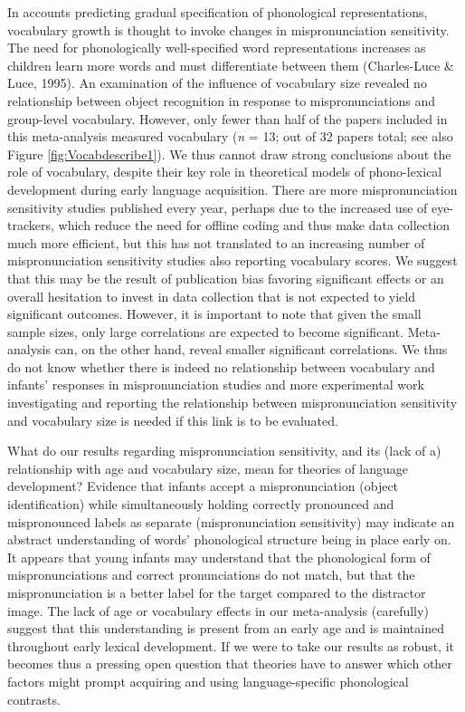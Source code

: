 \documentclass[man]{apa6}
\begin{document}
In accounts predicting gradual specification of phonological representations, vocabulary growth is thought to invoke changes in mispronunciation sensitivity. The need for phonologically well-specified word representations increases as children learn more words and must differentiate between them (Charles-Luce \& Luce, 1995). An examination of the influence of vocabulary size revealed no relationship between object recognition in response to mispronunciations and group-level vocabulary. However, only fewer than half of the papers included in this meta-analysis measured vocabulary (\emph{n} = 13; out of 32 papers total; see also Figure \ref{fig:Vocabdescribe1}). We thus cannot draw strong conclusions about the role of vocabulary, despite their key role in theoretical models of phono-lexical development during early language acquisition. There are more mispronunciation sensitivity studies published every year, perhaps due to the increased use of eye-trackers, which reduce the need for offline coding and thus make data collection much more efficient, but this has not translated to an increasing number of mispronunciation sensitivity studies also reporting vocabulary scores. We suggest that this may be the result of publication bias favoring significant effects or an overall hesitation to invest in data collection that is not expected to yield significant outcomes. However, it is important to note that given the small sample sizes, only large correlations are expected to become significant. Meta-analysis can, on the other hand, reveal smaller significant correlations. We thus do not know whether there is indeed no relationship between vocabulary and infants' responses in mispronunciation studies and more experimental work investigating and reporting the relationship between mispronunciation sensitivity and vocabulary size is needed if this link is to be evaluated.

What do our results regarding mispronunciation sensitivity, and its (lack of a) relationship with age and vocabulary size, mean for theories of language development? Evidence that infants accept a mispronunciation (object identification) while simultaneously holding correctly pronounced and mispronounced labels as separate (mispronunciation sensitivity) may indicate an abstract understanding of words' phonological structure being in place early on. It appears that young infants may understand that the phonological form of mispronunciations and correct pronunciations do not match, but that the mispronunciation is a better label for the target compared to the distractor image. The lack of age or vocabulary effects in our meta-analysis (carefully) suggest that this understanding is present from an early age and is maintained throughout early lexical development. If we were to take our results as robust, it becomes thus a pressing open question that theories have to answer which other factors might prompt acquiring and using language-specific phonological contrasts.
\end{document}
